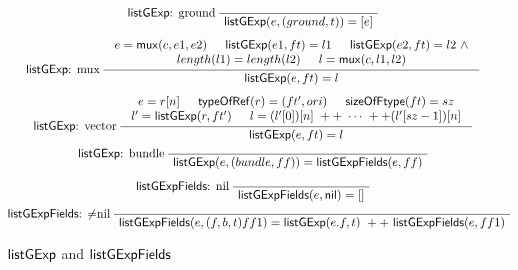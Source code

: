 \begin{figure}[htbp]
	\begin{gather*}
		\infernone[\listgexp: ground]
		{\listgexp(e, (ground, t)) = [e]}
		\quad
		\\[1ex]
		\infer[\listgexp: mux]
		{\listgexp(e, ft) = l}
		{
			\begin{array}{c}
				e = \mux(c, e1, e2) \hspace{15pt} \listgexp(e1, ft) = l1 \hspace{15pt} \listgexp(e2, ft) = l2\  \wedge\\
				length(l1) = length(l2) \hspace{15pt} l = \mux(c, l1, l2)
			\end{array}
		}
		\quad
		\\[1ex]
		\infer[\listgexp: vector]
		{\listgexp(e, ft) = l}
		{
			\begin{array}{c}
				e= r[n] \hspace{15pt} \typeofref(r) = (ft', ori) \hspace{15pt} \sizeofftype(ft) = sz \\
				l' = \listgexp(r, ft') \hspace{15pt} l = (l'[0])[n]\ ++ \ \cdots \ ++ (l'[sz-1])[n]
			\end{array}
		}
		\quad
		\\[1ex]
		\infernone[\listgexp: bundle]
		{\listgexp(e,  (bundle, ff) ) = \listgexpfields(e, ff)}
		\quad
		\\[2ex]
		\infernone[\listgexpfields: nil]
		{\listgexpfields(e, \nil) = []}
		\quad
		\\[1ex]
		\infernone[\listgexpfields: $\neq$nil]
		{\listgexpfields(e, (f, b, t) ff1) = \listgexp(e.f, t)\ ++\ \listgexpfields(e, ff1)}
	\end{gather*}
	\caption{${\sf listGExp}$ and ${\sf listGExpFields}$}
	\label{fig:list-gexp}
\end{figure}

